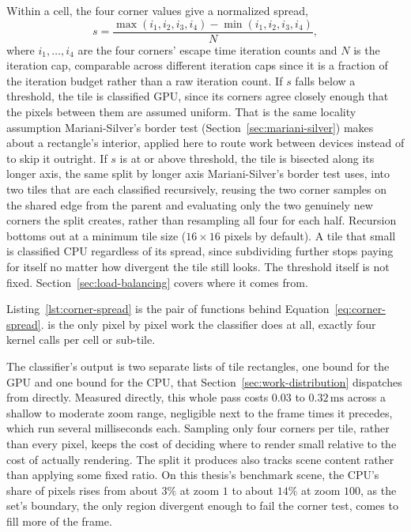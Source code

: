 \documentclass{ftndiplomski}
\begin{document}
Within a cell, the four corner values give a normalized spread,
\begin{equation}
  \label{eq:corner-spread}
  s = \frac{\max(i_1,i_2,i_3,i_4) - \min(i_1,i_2,i_3,i_4)}{N},
\end{equation}
where $i_1,\dots,i_4$ are the four corners' escape time iteration counts and $N$ is the iteration
cap, comparable across different iteration caps since it is a fraction of the iteration budget
rather than a raw iteration count. If $s$ falls below a threshold, the tile is
classified GPU, since its corners agree closely enough that the pixels between them are assumed
uniform. That is the same locality assumption Mariani-Silver's border test
(Section~\ref{sec:mariani-silver}) makes about a rectangle's interior, applied here to route work
between devices instead of to skip it outright. If $s$ is at or above threshold, the tile
is bisected along its longer axis, the same split by longer axis Mariani-Silver's border test uses,
into two tiles that are each classified recursively, reusing the two corner samples on the
shared edge from the parent and evaluating only the two genuinely new corners the split creates,
rather than resampling all four for each half. Recursion bottoms out at a minimum tile size
($16 \times 16$ pixels by default). A tile that small is classified CPU regardless of its spread,
since subdividing further stops paying for itself no matter how divergent the tile still looks.
The threshold itself is not fixed. Section~\ref{sec:load-balancing} covers where it comes from.

Listing~\ref{lst:corner-spread} is the pair of functions behind Equation~\ref{eq:corner-spread}.
 is the only pixel by pixel work the classifier does at all, exactly four
kernel calls per cell or sub-tile.

\noindent\begin{minipage}{\linewidth}

\end{minipage}

The classifier's output is two separate lists of tile rectangles, one bound for the GPU and one
bound for the CPU, that Section~\ref{sec:work-distribution} dispatches from directly. Measured
directly, this whole pass costs $0.03$ to $0.32\,\mathrm{ms}$ across a shallow to moderate zoom
range, negligible next to the frame times it precedes, which run several milliseconds each.
Sampling only four corners per tile, rather than every pixel, keeps the cost of deciding where to
render small relative to the cost of actually rendering. The split it produces also tracks scene
content rather than applying some fixed ratio. On this thesis's benchmark scene, the CPU's share
of pixels rises from about $3\%$ at zoom $1$ to about $14\%$ at zoom $100$, as the set's boundary,
the only region divergent enough to fail the corner test, comes to fill more of the frame.
\end{document}
